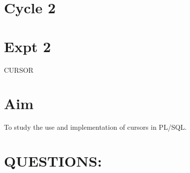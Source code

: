 \documentclass[13pt,oneside]{book}
\begin{document}
\section*{Cycle 2}
\section*{Expt 2}
\begin{center}
    \Large{CURSOR}
\end{center}

\section*{Aim}
\large To study the use and implementation of cursors in PL/SQL.
\section*{QUESTIONS:}
\end{document}

